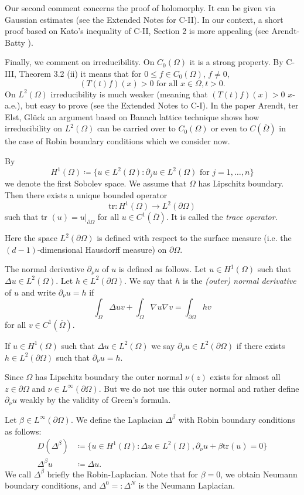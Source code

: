 Our second comment concerns the proof of holomorphy. It can be given via Gaussian estimates (see the Extended Notes for C-II). In our context, a short proof based on Kato's inequality of C-II, Section 2 is more appealing (see Arendt-Batty \cite{ArBa92}).

Finally, we comment on irreducibility. 
On $C_0(\Omega)$ it is a strong property. 
By C-III, Theorem 3.2 (ii) it means that for $0 \leq f \in C_0(\Omega)$, $f \neq 0$,
\[
(T(t)f)(x) > 0 \text{ for all } x \in \Omega, t > 0.
\]
On $L^2(\Omega)$ irreducibility is much weaker (meaning that $(T(t)f)(x) > 0$ $x$-a.e.), but easy to prove (see the Extended Notes to C-I). In the paper Arendt, ter Elst, Glück \cite{AEG20} an argument based on Banach lattice technique shows how irreducibility on $L^2(\Omega)$ can be carried over to $C_0(\Omega)$ or even to $C(\overline{\Omega})$ in the case of Robin boundary conditions which we consider now.

By %
\[
	H^1(\Omega) \coloneq \{u \in L^2(\Omega) \colon \partial_j u \in L^2(\Omega) \text{ for } j = 1, \ldots, n\}
\]
%
we denote the first Sobolev space.
We assume that $\Omega$ has Lipschitz boundary. 
Then there exists a unique bounded operator %
\[
	\text{tr} \colon H^1(\Omega) \to L^2(\partial\Omega)
\]
%
such that $\text{tr }(u) = u|_{\partial\Omega}$ for all $u \in C^1(\overline{\Omega})$. 
It is called the \emph{trace operator}.

Here the space $L^2(\partial\Omega)$ is defined with respect to the surface measure (i.e. the $(d-1)$-dimensional Hausdorff measure) on $\partial\Omega$.

The normal derivative $\partial_\nu u$ of $u$ is defined as follows. Let $u \in H^1(\Omega)$ such that $\Delta u \in L^2(\Omega)$. Let $h \in L^2(\partial\Omega)$. We say that $h$ is the \emph{(outer) normal derivative} of $u$ and write $\partial_\nu u = h$ if
\[\int_\Omega \Delta u v + \int_\Omega \nabla u \nabla v = \int_{\partial\Omega} h v\]
for all $v \in C^1(\overline{\Omega})$.

If $u \in H^1(\Omega)$ such that $\Delta u \in L^2(\Omega)$ we say $\partial_\nu u \in L^2(\partial\Omega)$ if there exists $h \in L^2(\partial\Omega)$ such that $\partial_\nu u = h$.
\begin{remark*}
Since $\Omega$ has Lipschitz boundary the outer normal $\nu(z)$ exists for almost all $z \in \partial\Omega$ and $\nu \in L^\infty(\partial\Omega)$. 
But we do not use this outer normal and rather define $\partial_\nu u$ weakly by the validity of Green's formula.
\end{remark*}
Let $\beta \in L^\infty(\partial\Omega)$. 
We define the Laplacian $\Delta^\beta$ with Robin boundary conditions as follows:
\begin{align}
	D(\Delta^\beta) &\coloneq \{u \in H^1(\Omega) : \Delta u \in L^2(\Omega), \partial_\nu u + \beta 				\text{tr}(u) = 0\} \\
	\Delta^\beta u &\coloneq \Delta u.
\end{align}
We call $\Delta^\beta$ briefly the Robin-Laplacian. Note that for $\beta = 0$, we obtain Neumann boundary conditions, and $\Delta^0 =: \Delta^N$ is the Neumann Laplacian.

